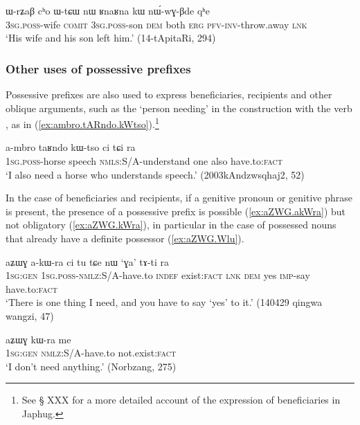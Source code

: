 \begin{exe}
\ex \label{ex:obv.nWwGBde}
\gll
ɯ-rʑaβ cʰo ɯ-tɕɯ nɯ ʁnaʁna kɯ nɯ́-wɣ-βde qʰe \\
\textsc{3sg.poss}-wife \textsc{comit} \textsc{3sg.poss}-son \textsc{dem} both \textsc{erg} \textsc{pfv}-\textsc{inv}-throw.away \textsc{lnk} \\
\glt `His wife and his son left him.' (14-tApitaRi, 294)
\end{exe}

\subsubsection{Other uses of possessive prefixes}
Possessive prefixes are also used to express beneficiaries, recipients and other oblique arguments, such as the `person needing' in the construction with the verb ,  as in (\ref{ex:ambro.tARndo.kWtso}).\footnote{See § XXX for a more detailed account of the expression of beneficiaries in Japhug.}

 \begin{exe}
\ex \label{ex:ambro.tARndo.kWtso}
\gll a-mbro taʁndo kɯ-tso ci tɕi ra \\
\textsc{1sg.poss}-horse speech \textsc{nmls}:S/A-understand one also have.to:\textsc{fact} \\
\glt `I also need a horse who understands speech.' (2003kAndzwsqhaj2, 52)
\end{exe}
In the case of beneficiaries and recipients, if a genitive pronoun or genitive phrase is present, the presence of a possessive prefix is possible (\ref{ex:aZWG.akWra}) but not obligatory (\ref{ex:aZWG.kWra}), in particular in the case of possessed nouns that already have a definite possessor (\ref{ex:aZWG.Wlu}).

 \begin{exe}
\ex \label{ex:aZWG.akWra}
\gll aʑɯɣ a-kɯ-ra ci tu tɕe nɯ `ɣa' tɤ-ti ra \\
\textsc{1sg:gen} \textsc{1sg.poss}-\textsc{nmlz}:S/A-have.to \textsc{indef} exist:\textsc{fact} \textsc{lnk} \textsc{dem} yes \textsc{imp}-say have.to:\textsc{fact} \\
\glt `There is one thing I need, and you have to say `yes' to it.' (140429 qingwa wangzi, 47)
\end{exe}

 \begin{exe}
\ex \label{ex:aZWG.kWra}
\gll  aʑɯɣ kɯ-ra me \\
\textsc{1sg:gen} \textsc{nmlz}:S/A-have.to not.exist:\textsc{fact} \\
\glt `I don't need anything.' (Norbzang, 275)
\end{exe}

